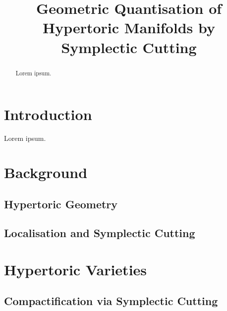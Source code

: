 \documentclass{article}
\title{Geometric Quantisation of Hypertoric Manifolds by Symplectic Cutting}
\date{}	%
\begin{document}
	\maketitle
	
	\begin{abstract}
		Lorem ipsum.
	\end{abstract}
	
	\section{Introduction}
	
	Lorem ipsum.
	
	\section{Background}
	
	\subsection{Hypertoric Geometry}
	
	\subsection{Localisation and Symplectic Cutting}
	
	
	
	\section{Hypertoric Varieties}

	\subsection{Compactification via Symplectic Cutting}
	
\end{document}
